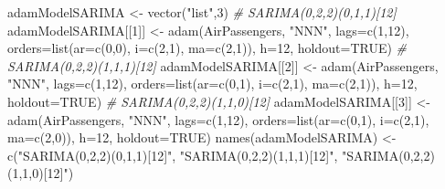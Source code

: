 \documentclass[
]{book}
\newenvironment{Shaded}{\begin{snugshade}}{\end{snugshade}}
\newcommand{\AttributeTok}[1]{\textcolor[rgb]{0.77,0.63,0.00}{#1}}
\newcommand{\CommentTok}[1]{\textcolor[rgb]{0.56,0.35,0.01}{\textit{#1}}}
\newcommand{\ConstantTok}[1]{\textcolor[rgb]{0.00,0.00,0.00}{#1}}
\newcommand{\DecValTok}[1]{\textcolor[rgb]{0.00,0.00,0.81}{#1}}
\newcommand{\FunctionTok}[1]{\textcolor[rgb]{0.00,0.00,0.00}{#1}}
\newcommand{\NormalTok}[1]{#1}
\newcommand{\OtherTok}[1]{\textcolor[rgb]{0.56,0.35,0.01}{#1}}
\newcommand{\StringTok}[1]{\textcolor[rgb]{0.31,0.60,0.02}{#1}}
\theoremstyle{definition}
\theoremstyle{definition}
\theoremstyle{definition}
\theoremstyle{definition}
\theoremstyle{remark}
\begin{document}
\begin{Shaded}
\begin{Highlighting}[]
\NormalTok{adamModelSARIMA }\OtherTok{\textless{}{-}} \FunctionTok{vector}\NormalTok{(}\StringTok{"list"}\NormalTok{,}\DecValTok{3}\NormalTok{)}
\CommentTok{\# SARIMA(0,2,2)(0,1,1)[12]}
\NormalTok{adamModelSARIMA[[}\DecValTok{1}\NormalTok{]] }\OtherTok{\textless{}{-}} \FunctionTok{adam}\NormalTok{(AirPassengers, }\StringTok{"NNN"}\NormalTok{, }\AttributeTok{lags=}\FunctionTok{c}\NormalTok{(}\DecValTok{1}\NormalTok{,}\DecValTok{12}\NormalTok{),}
                             \AttributeTok{orders=}\FunctionTok{list}\NormalTok{(}\AttributeTok{ar=}\FunctionTok{c}\NormalTok{(}\DecValTok{0}\NormalTok{,}\DecValTok{0}\NormalTok{), }\AttributeTok{i=}\FunctionTok{c}\NormalTok{(}\DecValTok{2}\NormalTok{,}\DecValTok{1}\NormalTok{),}
                                         \AttributeTok{ma=}\FunctionTok{c}\NormalTok{(}\DecValTok{2}\NormalTok{,}\DecValTok{1}\NormalTok{)),}
                             \AttributeTok{h=}\DecValTok{12}\NormalTok{, }\AttributeTok{holdout=}\ConstantTok{TRUE}\NormalTok{)}
\CommentTok{\# SARIMA(0,2,2)(1,1,1)[12]}
\NormalTok{adamModelSARIMA[[}\DecValTok{2}\NormalTok{]] }\OtherTok{\textless{}{-}} \FunctionTok{adam}\NormalTok{(AirPassengers, }\StringTok{"NNN"}\NormalTok{, }\AttributeTok{lags=}\FunctionTok{c}\NormalTok{(}\DecValTok{1}\NormalTok{,}\DecValTok{12}\NormalTok{),}
                             \AttributeTok{orders=}\FunctionTok{list}\NormalTok{(}\AttributeTok{ar=}\FunctionTok{c}\NormalTok{(}\DecValTok{0}\NormalTok{,}\DecValTok{1}\NormalTok{), }\AttributeTok{i=}\FunctionTok{c}\NormalTok{(}\DecValTok{2}\NormalTok{,}\DecValTok{1}\NormalTok{),}
                                         \AttributeTok{ma=}\FunctionTok{c}\NormalTok{(}\DecValTok{2}\NormalTok{,}\DecValTok{1}\NormalTok{)),}
                             \AttributeTok{h=}\DecValTok{12}\NormalTok{, }\AttributeTok{holdout=}\ConstantTok{TRUE}\NormalTok{)}
\CommentTok{\# SARIMA(0,2,2)(1,1,0)[12]}
\NormalTok{adamModelSARIMA[[}\DecValTok{3}\NormalTok{]] }\OtherTok{\textless{}{-}} \FunctionTok{adam}\NormalTok{(AirPassengers, }\StringTok{"NNN"}\NormalTok{, }\AttributeTok{lags=}\FunctionTok{c}\NormalTok{(}\DecValTok{1}\NormalTok{,}\DecValTok{12}\NormalTok{),}
                             \AttributeTok{orders=}\FunctionTok{list}\NormalTok{(}\AttributeTok{ar=}\FunctionTok{c}\NormalTok{(}\DecValTok{0}\NormalTok{,}\DecValTok{1}\NormalTok{), }\AttributeTok{i=}\FunctionTok{c}\NormalTok{(}\DecValTok{2}\NormalTok{,}\DecValTok{1}\NormalTok{),}
                                         \AttributeTok{ma=}\FunctionTok{c}\NormalTok{(}\DecValTok{2}\NormalTok{,}\DecValTok{0}\NormalTok{)),}
                             \AttributeTok{h=}\DecValTok{12}\NormalTok{, }\AttributeTok{holdout=}\ConstantTok{TRUE}\NormalTok{)}
\FunctionTok{names}\NormalTok{(adamModelSARIMA) }\OtherTok{\textless{}{-}} \FunctionTok{c}\NormalTok{(}\StringTok{"SARIMA(0,2,2)(0,1,1)[12]"}\NormalTok{,}
                            \StringTok{"SARIMA(0,2,2)(1,1,1)[12]"}\NormalTok{,}
                            \StringTok{"SARIMA(0,2,2)(1,1,0)[12]"}\NormalTok{)}
\end{Highlighting}
\end{Shaded}
\end{document}
